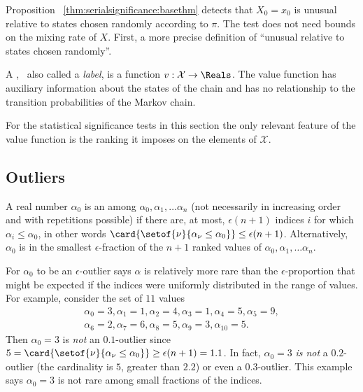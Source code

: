 \documentclass[12pt]{article}
\begin{document}
Proposition~%
\ref{thm:serialsignificance:basethm} detects that \( X_0 = x_0 \) is
unusual relative to states chosen randomly according to \( \pi \).  The
test does not need bounds on the mixing rate of \( X \).  First, a more
precise definition of ``unusual relative to states chosen randomly''.

\begin{definition}
    A ,~%
    also called a \emph{label}, is a function \( v :  \mathcal{X} \to
    \Reals \).  The value function has auxiliary information about the
    states of the chain and has no relationship to the transition
    probabilities of the Markov chain.
\end{definition}

\begin{remark}
    For the statistical significance tests in this section the only
    relevant feature of the value function is the ranking it imposes on
    the elements of \( \mathcal{X} \).
\end{remark}

\subsection*{Outliers}

\begin{definition}
    A real number \( \alpha_0 \) is an %
    among \( \alpha_0, \alpha_1, \dots \alpha_n \) (not necessarily
    in increasing order and with repetitions
    possible) if there are, at most, \( \epsilon(n + 1) \) indices \( i \)
    for which \( \alpha_i \le \alpha_0 \), in other words \( \card{%
    \setof{\nu}{\alpha_{\nu} \le \alpha_0}} \le \epsilon(n+1) \).
    Alternatively, \( \alpha_0 \) is in the smallest \( \epsilon \)-fraction
    of the \( n + 1 \) ranked values of \( \alpha_0, \alpha_1, \dots
    \alpha_n \).
\end{definition}

\begin{remark}
    For \( \alpha_0 \) to be an \( \epsilon \)-outlier says \( \alpha \)
    is relatively more rare than the \( \epsilon \)-proportion that
    might be expected if the indices were uniformly distributed in the
    range of values.  For example, consider the set of \( 11 \) values
    \begin{multline*}
        \alpha_0 = 3, \alpha_1 = 1, \alpha_2 = 4, \alpha_3 = 1,
        \alpha_4 = 5, \alpha_5 = 9, \\
        \alpha_6 = 2, \alpha_7 = 6, \alpha_8 = 5, \alpha_9 = 3, \alpha_{10}
        = 5.
    \end{multline*}
    Then \( \alpha_0 = 3 \) is \emph{not} an \( 0.1 \)-outlier since \(
    5 = \card{%
    \setof{\nu}{\alpha_\nu \le \alpha_0}} \ge \epsilon(n+1) = 1.1 \).
    In fact, \( \alpha_0 = 3 \) \emph{is not} a \( 0.2 \)-outlier (the
    cardinality is \( 5 \), greater than \( 2.2 \)) or even a \( 0.3 \)-outlier.
    This example says \( \alpha_0 = 3 \) is not rare among small
    fractions of the indices.

\end{remark}
\end{document}
